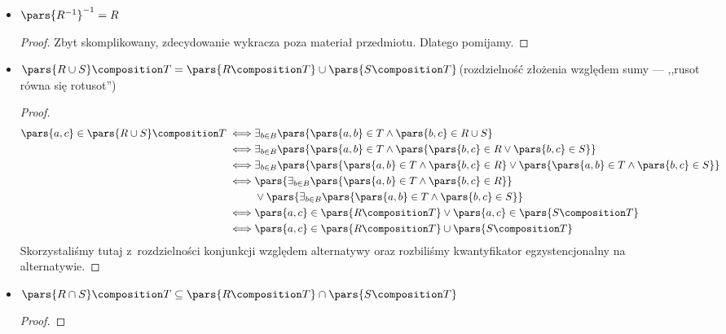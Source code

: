 \begin{description}
\begin{itemize}
\begin{proof}
                \end{proof}
            \item \(\pars{R^{-1}}^{-1} = R\)
                \begin{proof}
                    Zbyt skomplikowany, zdecydowanie wykracza poza materiał przedmiotu. Dlatego pomijamy.
                \end{proof}
            \item \(\pars{R \cup S} \composition T = \pars{R \composition T} \cup \pars{S \composition T}\)\qquad (rozdzielność złożenia względem sumy --- ,,rusot równa się rotusot'')
                \begin{proof}
                    \begin{equation*}
                        \begin{split}
                            \pars{a, c} \in \pars{R \cup S} \composition T
                                \iff& \exists_{b \in B} \pars{\pars{a, b} \in T \land \pars{b, c} \in R \cup S}\\
                                \iff& \exists_{b \in B} \pars{\pars{a, b} \in T \land \pars{\pars{b, c} \in R \lor \pars{b, c} \in S}}\\
                                \iff& \exists_{b \in B} \pars{\pars{\pars{a, b} \in T \land \pars{b, c} \in R} \lor \pars{\pars{a, b} \in T \land \pars{b, c} \in S}}\\
                                \iff& \pars{\exists_{b \in B} \pars{\pars{a, b} \in T \land \pars{b, c} \in R}}\\
                                    &\lor \pars{\exists_{b \in B}\pars{\pars{a, b} \in T \land \pars{b, c} \in S}}\\
                                \iff& \pars{a, c} \in \pars{R \composition T} \lor \pars{a, c} \in \pars{S \composition T}\\
                                \iff& \pars{a, c} \in \pars{R \composition T} \cup \pars{S \composition T}
                        \end{split}
                    \end{equation*}
                    Skorzystaliśmy tutaj z~rozdzielności konjunkcji względem alternatywy oraz rozbiliśmy kwantyfikator egzystencjonalny na alternatywie.
                \end{proof}
            \item \(\pars{R \cap S} \composition T \subseteq \pars{R \composition T} \cap \pars{S \composition T}\)
                \begin{proof}

\end{proof}
\end{itemize}
\end{description}
